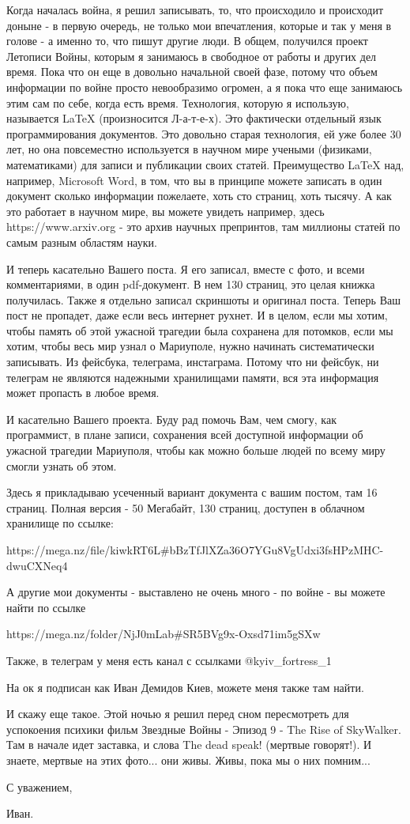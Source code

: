 Когда началась война, я решил записывать, то, что происходило и происходит
доныне - в первую очередь, не только мои впечатления, которые и так у меня в
голове - а именно то, что пишут другие люди. В общем, получился проект Летописи
Войны, которым я занимаюсь в свободное от работы и других дел время. Пока что
он еще в довольно начальной своей фазе, потому что объем информации по войне
просто невообразимо огромен, а я пока что еще занимаюсь этим сам по себе, когда есть время.
Технология, которую я использую, называется LaTeX (произносится Л-а-т-е-х). Это
фактически отдельный язык программирования документов. Это довольно старая
технология, ей уже более 30 лет, но она повсеместно используется в научном мире
учеными (физиками, математиками) для записи и публикации своих статей.
Преимущество LaTeX над, например, Microsoft Word, в том, что вы в принципе
можете записать в один документ сколько информации пожелаете, хоть сто страниц,
хоть тысячу. А как это работает в научном мире, вы можете увидеть например,
здесь https://www.arxiv.org - это архив научных препринтов, там миллионы статей
по самым разным областям науки.

И теперь касательно Вашего поста.  Я его записал, вместе с фото, и всеми
комментариями, в один pdf-документ. В нем 130 страниц, это целая книжка
получилась. Также я отдельно записал скриншоты и оригинал поста. Теперь Ваш
пост не пропадет, даже если весь интернет рухнет. И в целом, если мы хотим,
чтобы память об этой ужасной трагедии была сохранена для потомков, если мы
хотим, чтобы весь мир узнал о Мариуполе, нужно начинать систематически
записывать. Из фейсбука, телеграма, инстаграма. Потому что ни фейсбук, ни
телеграм не являются надежными хранилищами памяти, вся эта информация может
пропасть в любое время.

И касательно Вашего проекта. Буду рад помочь Вам, чем смогу, как программист,
в плане записи, сохранения всей доступной информации об ужасной трагедии
Мариуполя, чтобы как можно больше людей по всему миру смогли узнать об этом.

Здесь я прикладываю усеченный вариант документа с вашим постом, там 16 страниц.
Полная версия - 50 Мегабайт, 130 страниц, доступен в облачном хранилище по
ссылке:

https://mega.nz/file/kiwkRT6L#bBzTfJlXZa36O7YGu8VgUdxi3fsHPzMHC-dwuCXNeq4

А другие мои документы - выставлено не очень много - по войне - вы можете найти
по ссылке

https://mega.nz/folder/NjJ0mLab#SR5BVg9x-Oxsd71im5gSXw

Также, в телеграм у меня есть канал с ссылками @kyiv_fortress_1

На ок я подписан как Иван Демидов Киев, можете меня также там найти.

И скажу еще такое. Этой ночью я решил перед сном пересмотреть для успокоения
психики фильм Звездные Войны - Эпизод 9 - The Rise of SkyWalker. Там в начале
идет заставка, и слова The dead speak! (мертвые говорят!). И знаете, мертвые на
этих фото... они живы. Живы, пока мы о них помним...

С уважением,

Иван.
